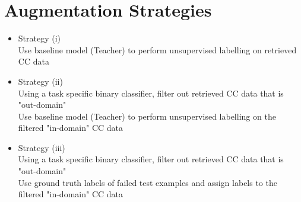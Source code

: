 \documentclass[twocolumn]{article}
\begin{document}
\section{Augmentation Strategies}
\label{sec:orge5aa177}
\begin{itemize}
\item Strategy (i)\\
Use baseline model (Teacher) to perform unsupervised labelling on retrieved CC data
\item Strategy (ii)\\
Using a task specific binary classifier, 
filter out retrieved CC data that is "out-domain"\\
Use baseline model (Teacher) to perform unsupervised labelling on the filtered "in-domain" CC data
\item Strategy (iii)\\
Using a task specific binary classifier, 
filter out retrieved CC data that is "out-domain"\\
Use ground truth labels of failed test examples and assign labels to the filtered "in-domain" CC data
\end{itemize}
\end{document}
